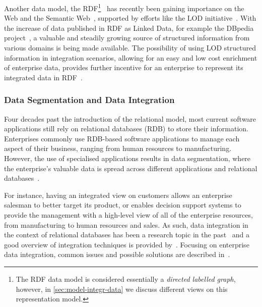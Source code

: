 Another data model, the \acf{RDF}\footnote{The \ac{RDF} data model is considered essentially a \emph{directed labelled
    graph}, however, in \cref{sec:model-integr-data} we discuss different views on this representation
  model.}~\cite{ManolaMiller:2004aa} has recently been gaining importance on the Web and the Semantic
Web~\cite{LeeHendlerLassila:2001aa}, supported by efforts like the \ac{LOD}
initiative~\cite{BizerHeathBerners-Lee:2009ab}.
%
With the increase of data published in \ac{RDF} as Linked Data, for example the DBpedia
project~\cite{BizerLehmannKobilarov:2009aa}, a valuable and steadily growing source of structured information from
various domains is being made available.
%
The possibility of using \ac{LOD} structured information in integration scenarios, allowing for an easy and low cost
enrichment of enterprise data, provides further incentive for an enterprise to represent its integrated data in
\ac{RDF}~\cite{Stephens:2007aa}.



\subsubsection*{Data Segmentation and Data Integration}

Four decades past the introduction of the relational model, most current software applications still rely on relational
databases (RDB) to store their information.
%
Enterprises commonly use RDB-based software applications to manage each aspect of their business, ranging from human
resources to manufacturing.  However, the use of specialised applications results in data segmentation, where the
enterprise's valuable data is spread across different applications and relational
databases~\cite{Dillnut:2006aa,SilberschatzKorthSudarshan:2005aa,BernsteinHaas:2008aa}.


%
For instance, having an integrated view on customers allows an enterprise salesman to better target its product, or
enables decision support systems to provide the management with a high-level view of all of the enterprise resources,
from manufacturing to human resources and sales.
%
As such, data integration in the context of relational databases has been a research topic in the
past~\cite{HalevyRajaramanOrdille:2006aa} and a good overview of integration techniques is provided
by~\citet{DoanHalevy:2005aa}.
%
Focusing on enterprise data integration, common issues and possible solutions are described
in~\citet{ZieglerDittrich:2004aa,HalevyAshishBitton:2005aa}.


